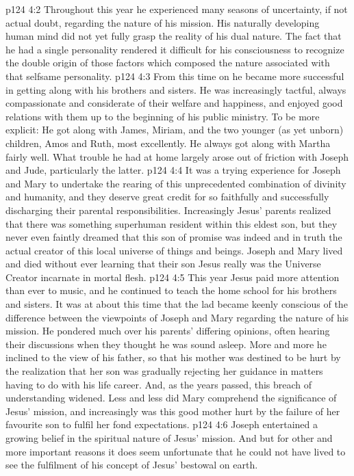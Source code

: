 \vs p124 4:2 Throughout this year he experienced many seasons of uncertainty, if not actual doubt, regarding the nature of his mission. His naturally developing human mind did not yet fully grasp the reality of his dual nature. The fact that he had a single personality rendered it difficult for his consciousness to recognize the double origin of those factors which composed the nature associated with that selfsame personality.
\vs p124 4:3 From this time on he became more successful in getting along with his brothers and sisters. He was increasingly tactful, always compassionate and considerate of their welfare and happiness, and enjoyed good relations with them up to the beginning of his public ministry. To be more explicit: He got along with James, Miriam, and the two younger (as yet unborn) children, Amos and Ruth, most excellently. He always got along with Martha fairly well. What trouble he had at home largely arose out of friction with Joseph and Jude, particularly the latter.
\vs p124 4:4 \pc It was a trying experience for Joseph and Mary to undertake the rearing of this unprecedented combination of divinity and humanity, and they deserve great credit for so faithfully and successfully discharging their parental responsibilities. Increasingly Jesus’ parents realized that there was something superhuman resident within this eldest son, but they never even faintly dreamed that this son of promise was indeed and in truth the actual creator of this local universe of things and beings. Joseph and Mary lived and died without ever learning that their son Jesus really was the Universe Creator incarnate in mortal flesh.
\vs p124 4:5 This year Jesus paid more attention than ever to music, and he continued to teach the home school for his brothers and sisters. It was at about this time that the lad became keenly conscious of the difference between the viewpoints of Joseph and Mary regarding the nature of his mission. He pondered much over his parents’ differing opinions, often hearing their discussions when they thought he was sound asleep. More and more he inclined to the view of his father, so that his mother was destined to be hurt by the realization that her son was gradually rejecting her guidance in matters having to do with his life career. And, as the years passed, this breach of understanding widened. Less and less did Mary comprehend the significance of Jesus’ mission, and increasingly was this good mother hurt by the failure of her favourite son to fulfil her fond expectations.
\vs p124 4:6 Joseph entertained a growing belief in the spiritual nature of Jesus’ mission. And but for other and more important reasons it does seem unfortunate that he could not have lived to see the fulfilment of his concept of Jesus’ bestowal on earth.
